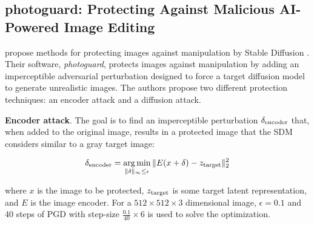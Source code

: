 \documentclass{article} %
\begin{document}

\subsection{photoguard: Protecting Against Malicious AI-Powered Image Editing}
\label{subsection:photoguard-overview}

\citet{salman2023raising} propose methods for protecting images against manipulation by Stable Diffusion \citep{rombach2022high}. Their software, \textit{photoguard}, protects images against manipulation by adding an imperceptible adversarial perturbation designed to force a target diffusion model to generate unrealistic images. The authors propose two different protection techniques: an encoder attack and a diffusion attack. 

\textbf{Encoder attack}. The goal is to find an imperceptible perturbation $\delta_{\rm encoder}$ that, when added to the original image, results in a protected image that the SDM considers similar to a gray target image: 

\begin{equation}
    \delta_{\rm encoder} = \operatorname*{arg\,min}_{\|\delta\|_{\infty} \leq \epsilon} \|E(x + \delta) - z_{\rm target} \|_{2}^{2}
    \label{eq:encoder-attack}
\end{equation}

\noindent
where $x$ is the image to be protected, $z_{\rm target}$ is some target latent representation, and $E$ is the image encoder. For a $512 \times 512 \times 3$ dimensional image, $\epsilon = 0.1$ and 40 steps of PGD with step-size $\frac{0.1}{40} \times 6$ is used to solve the optimization.
\end{document}
